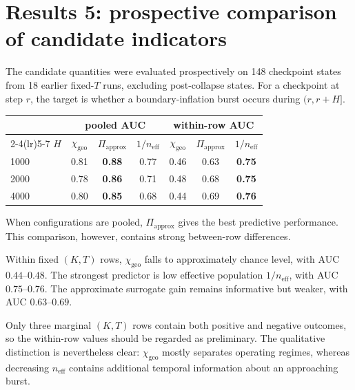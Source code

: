 \documentclass[11pt,a4paper]{article}
\newcommand{\neff}{n_{\mathrm{eff}}}
\newcommand{\chigeo}{\chi_{\mathrm{geo}}}
\begin{document}
\section{Results 5: prospective comparison of candidate indicators}
\label{sec:prospective}

The candidate quantities were evaluated prospectively on 148 checkpoint states from 18 earlier fixed-\(T\) runs, excluding post-collapse states. For a checkpoint at step \(r\), the target is whether a boundary-inflation burst occurs during \((r,r+H]\).

\begin{center}\small
\begin{tabular}{lcccccc}
\toprule
& \multicolumn{3}{c}{pooled AUC}
& \multicolumn{3}{c}{within-row AUC} \\
\cmidrule(lr){2-4}\cmidrule(lr){5-7}
\(H\)
& \(\chigeo\)
& \(\Pi_{\mathrm{approx}}\)
& \(1/\neff\)
& \(\chigeo\)
& \(\Pi_{\mathrm{approx}}\)
& \(1/\neff\) \\
\midrule
1000 & 0.81 & \textbf{0.88} & 0.77 & 0.46 & 0.63 & \textbf{0.75} \\
2000 & 0.78 & \textbf{0.86} & 0.71 & 0.48 & 0.68 & \textbf{0.75} \\
4000 & 0.80 & \textbf{0.85} & 0.68 & 0.44 & 0.69 & \textbf{0.76} \\
\bottomrule
\end{tabular}
\end{center}

When configurations are pooled, \(\Pi_{\mathrm{approx}}\) gives the best predictive performance. This comparison, however, contains strong between-row differences.

Within fixed \((K,T)\) rows, \(\chigeo\) falls to approximately chance level, with AUC \(0.44\)--\(0.48\). The strongest predictor is low effective population \(1/\neff\), with AUC \(0.75\)--\(0.76\). The approximate surrogate gain remains informative but weaker, with AUC \(0.63\)--\(0.69\).

Only three marginal \((K,T)\) rows contain both positive and negative outcomes, so the within-row values should be regarded as preliminary. The qualitative distinction is nevertheless clear: \(\chigeo\) mostly separates operating regimes, whereas decreasing \(\neff\) contains additional temporal information about an approaching burst.

\end{document}
